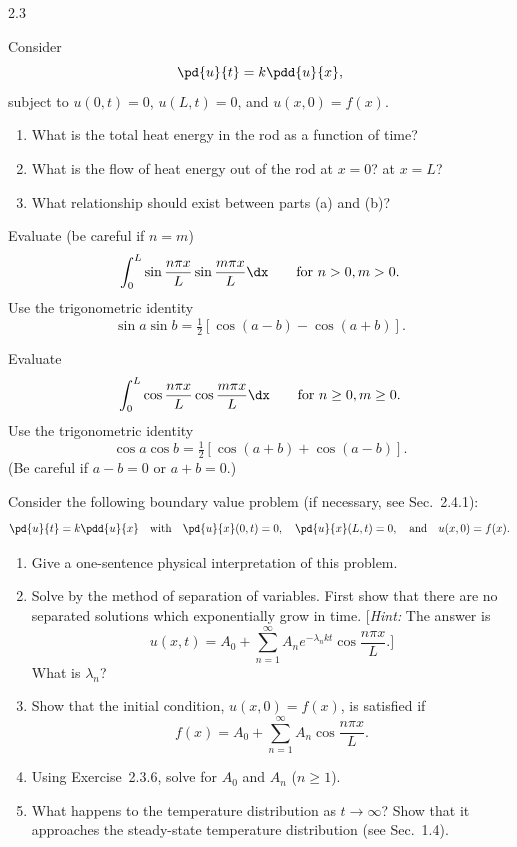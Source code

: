 \begin{exercises}{2.3}
\item Consider
\[
\pd{u}{t} = k\pdd{u}{x},
\]
subject to $u(0,t) = 0$, $u(L,t) = 0$, and $u(x,0) = f(x)$.
\begin{enumerate}
\item[\starred(a)] What is the total heat energy in the rod as a function of time?
\item[(b)] What is the flow of heat energy out of the rod at $x = 0$? at $x = L$?
\item[\starred(c)] What relationship should exist between parts (a) and (b)?
\end{enumerate}

\item Evaluate (be careful if $n = m$)
\[
\int_0^L \sin\frac{n\pi x}{L}\sin\frac{m\pi x}{L}\dx \qquad\text{for } n > 0, m > 0.
\]
Use the trigonometric identity
\[
\sin a\sin b = \tfrac{1}{2}\left[\cos(a-b) - \cos(a+b)\right].
\]

\item\starred{} Evaluate
\[
\int_0^L \cos\frac{n\pi x}{L}\cos\frac{m\pi x}{L}\dx \qquad\text{for } n \ge 0, m \ge 0.
\]
Use the trigonometric identity
\[
\cos a\cos b = \tfrac{1}{2}\left[\cos(a+b) + \cos(a-b)\right].
\]
(Be careful if $a - b = 0$ or $a + b = 0$.)

\item Consider the following boundary value problem (if necessary, see Sec.~2.4.1):
\[
\pd{u}{t} = k\pdd{u}{x} \quad\text{with}\quad \pd{u}{x}(0,t) = 0,\quad \pd{u}{x}(L,t) = 0, \quad\text{and}\quad u(x,0) = f(x).
\]
\begin{enumerate}
\item[(a)] Give a one-sentence physical interpretation of this problem.
\item[(b)] Solve by the method of separation of variables. First show that there are no separated solutions which exponentially grow in time. [\emph{Hint:} The answer is
\[
u(x,t) = A_0 + \sum_{n=1}^{\infty} A_n e^{-\lambda_n kt}\cos\frac{n\pi x}{L}.]
\]
What is $\lambda_n$?
\item[(c)] Show that the initial condition, $u(x,0) = f(x)$, is satisfied if
\[
f(x) = A_0 + \sum_{n=1}^{\infty} A_n\cos\frac{n\pi x}{L}.
\]
\item[(d)] Using Exercise~2.3.6, solve for $A_0$ and $A_n$ ($n \ge 1$).
\item[(e)] What happens to the temperature distribution as $t \to \infty$? Show that it approaches the steady-state temperature distribution (see Sec.~1.4).
\end{enumerate}


\end{exercises}
